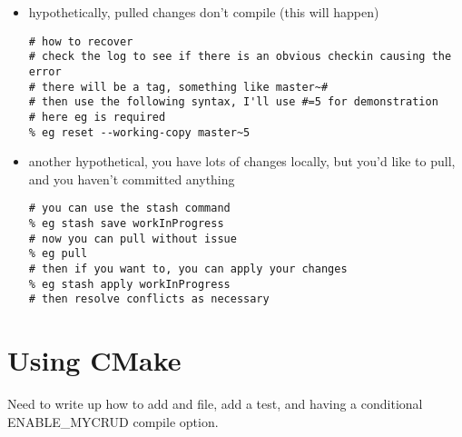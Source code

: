 \documentclass[pdf,12pt,report,strict]{SANDreport}
\theoremstyle{remark}
\begin{document}
\begin{itemize}
\item hypothetically, pulled changes don't compile (this will happen)
\begin{verbatim}
# how to recover
# check the log to see if there is an obvious checkin causing the error
# there will be a tag, something like master~#
# then use the following syntax, I'll use #=5 for demonstration
# here eg is required
% eg reset --working-copy master~5
\end{verbatim}

\item another hypothetical, you have lots of changes locally, but
  you'd like to pull, and you haven't committed anything
\begin{verbatim}
# you can use the stash command
% eg stash save workInProgress
# now you can pull without issue
% eg pull
# then if you want to, you can apply your changes
% eg stash apply workInProgress
# then resolve conflicts as necessary
\end{verbatim}
\end{itemize}

\section{Using CMake}

Need to write up how to add and file, add a test, and having a
conditional ENABLE\_MYCRUD compile option.


%
\clearpage
\providecommand*{\phantomsection}{}
\phantomsection
{}



%

\begin{SANDdistribution}[CA]%

  \SANDdistExternal{}{}
  \bigskip


  \SANDdistInternal{}{}{}{}

  \SANDdistInternalM{}{}{}{}
\end{SANDdistribution}


\end{document}
